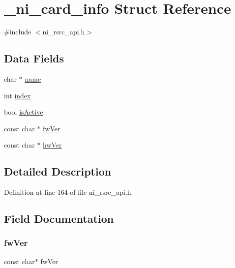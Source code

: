\hypertarget{struct__ni__card__info}{}\section{\+\_\+ni\+\_\+card\+\_\+info Struct Reference}
\label{struct__ni__card__info}


{\ttfamily \#include $<$ni\+\_\+rsrc\+\_\+api.\+h$>$}

\subsection*{Data Fields}
\begin{DoxyCompactItemize}
\item 
char $\ast$ \mbox{\hyperlink{struct__ni__card__info_a5ac083a645d964373f022d03df4849c8}{name}}
\item 
int \mbox{\hyperlink{struct__ni__card__info_a750b5d744c39a06bfb13e6eb010e35d0}{index}}
\item 
bool \mbox{\hyperlink{struct__ni__card__info_a96eff8420fb9ee1b4c5d5f1bcace116d}{is\+Active}}
\item 
const char $\ast$ \mbox{\hyperlink{struct__ni__card__info_a4122aea62e012bd58adba35364a737e5}{fw\+Ver}}
\item 
const char $\ast$ \mbox{\hyperlink{struct__ni__card__info_a383266b2c323217c22fe4ee349525e05}{hw\+Ver}}
\end{DoxyCompactItemize}


\subsection{Detailed Description}


Definition at line 164 of file ni\+\_\+rsrc\+\_\+api.\+h.



\subsection{Field Documentation}
\mbox{\label{struct__ni__card__info_a4122aea62e012bd58adba35364a737e5}} 
\subsubsection{\texorpdfstring{fwVer}{fwVer}}
{\footnotesize\ttfamily const char$\ast$ fw\+Ver}




